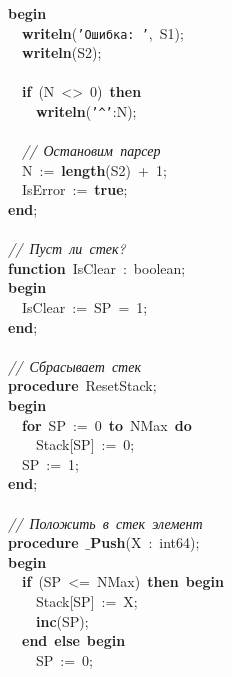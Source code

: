 \mbox{}\textbf{begin} \\
\mbox{}\ \ \textbf{writeln}(\texttt{'Ошибка:\ '},\ S1); \\
\mbox{}\ \ \textbf{writeln}(S2); \\
\mbox{} \\
\mbox{}\ \ \textbf{if}\ (N\ \textless{}\textgreater{}\ 0)\ \textbf{then} \\
\mbox{}\ \ \ \ \textbf{writeln}(\texttt{'\textasciicircum{}'}:N); \\
\mbox{} \\
\mbox{}\ \ \textit{//\ Остановим\ парсер} \\
\mbox{}\ \ N\ :=\ \textbf{length}(S2)\ +\ 1; \\
\mbox{}\ \ IsError\ :=\ \textbf{true}; \\
\mbox{}\textbf{end}; \\
\mbox{} \\
\mbox{}\textit{//\ Пуст\ ли\ стек?} \\
\mbox{}\textbf{function}\ IsClear\ :\ boolean; \\
\mbox{}\textbf{begin} \\
\mbox{}\ \ IsClear\ :=\ SP\ =\ 1; \\
\mbox{}\textbf{end}; \\
\mbox{} \\
\mbox{}\textit{//\ Сбрасывает\ стек} \\
\mbox{}\textbf{procedure}\ ResetStack; \\
\mbox{}\textbf{begin} \\
\mbox{}\ \ \textbf{for}\ SP\ :=\ 0\ \textbf{to}\ NMax\ \textbf{do} \\
\mbox{}\ \ \ \ Stack[SP]\ :=\ 0; \\
\mbox{}\ \ SP\ :=\ 1; \\
\mbox{}\textbf{end}; \\
\mbox{} \\
\mbox{}\textit{//\ Положить\ в\ стек\ элемент} \\
\mbox{}\textbf{procedure}\ \textbf{$\_$Push}(X\ :\ int64); \\
\mbox{}\textbf{begin} \\
\mbox{}\ \ \textbf{if}\ (SP\ \textless{}=\ NMax)\ \textbf{then}\ \textbf{begin} \\
\mbox{}\ \ \ \ Stack[SP]\ :=\ X; \\
\mbox{}\ \ \ \ \textbf{inc}(SP); \\
\mbox{}\ \ \textbf{end}\ \textbf{else}\ \textbf{begin} \\
\mbox{}\ \ \ \ SP\ :=\ 0; \\
